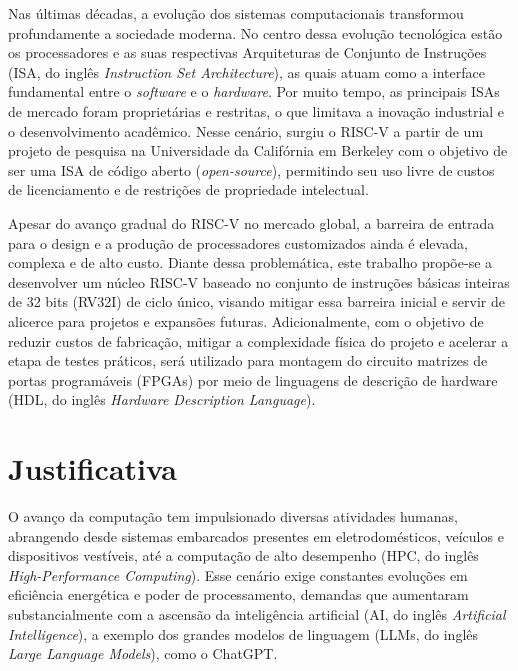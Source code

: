 





Nas últimas décadas, a evolução dos sistemas computacionais transformou profundamente a sociedade moderna. No centro dessa evolução tecnológica estão os processadores e as suas respectivas Arquiteturas de Conjunto de Instruções (ISA, do inglês \textit{Instruction Set Architecture}), as quais atuam como a interface fundamental entre o \textit{software} e o \textit{hardware}. Por muito tempo, as principais ISAs de mercado foram proprietárias e restritas, o que limitava a inovação industrial e o desenvolvimento acadêmico. Nesse cenário, surgiu o RISC-V a partir de um projeto de pesquisa na Universidade da Califórnia em Berkeley com o objetivo de ser uma ISA de código aberto (\textit{open-source}), permitindo seu uso livre de custos de licenciamento e de restrições de propriedade intelectual.

Apesar do avanço gradual do RISC-V no mercado global, a barreira de entrada para o design e a produção de processadores customizados ainda é elevada, complexa e de alto custo. Diante dessa problemática, este trabalho propõe-se a desenvolver um núcleo RISC-V baseado no conjunto de instruções básicas inteiras de 32 bits (RV32I) de ciclo único, visando mitigar essa barreira inicial e servir de alicerce para projetos e expansões futuras. Adicionalmente, com o objetivo de reduzir custos de fabricação, mitigar a complexidade física do projeto e acelerar a etapa de testes práticos, será utilizado para montagem do circuito matrizes de portas programáveis (FPGAs) por meio de linguagens de descrição de hardware (HDL, do inglês \textit{Hardware Description Language}).

\section{Justificativa}
O avanço da computação tem impulsionado diversas atividades humanas, abrangendo desde sistemas embarcados presentes em eletrodomésticos, veículos e dispositivos vestíveis, até a computação de alto desempenho (HPC, do inglês \textit{High-Performance Computing}). Esse cenário exige constantes evoluções em eficiência energética e poder de processamento, demandas que aumentaram substancialmente com a ascensão da inteligência artificial (AI, do inglês \textit{Artificial Intelligence}), a exemplo dos grandes modelos de linguagem (LLMs, do inglês \textit{Large Language Models}), como o ChatGPT.

